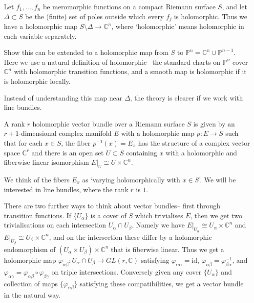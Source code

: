 Let \(f_1,\ldots,f_n\) be meromorphic functions on a compact Riemann surface \(S\),
and let \(\Delta\subset S\) be the (finite) set of poles outside which every
\(f_j\) is holomorphic. Thus we have a holomorphic map \(S\setminus \Delta
\to \mathbb{C}^n\), where `holomorphic' means holomorphic in each variable
separately.

\begin{exercise}
    Show this can be extended to a holomorphic map from \(S\) to
    \(\mathbb{P}^n=\mathbb{C}^n\cup \mathbb{P}^{n-1}\). Here we use a natural
    definition of holomorphic-- the standard charts on \(\mathbb{P}^n\) cover
    \(\mathbb{C}^n\) with holomorphic transition functions, and a smooth map is
    holomorphic if it is holomorphic locally.
\end{exercise}

Instead of understanding this map near \(\Delta\), the theory is clearer if we work with line bundles.

\begin{definition}
    A rank \(r\) holomorphic vector bundle over a Riemann surface \(S\) is
    given by an \(r+1\)-dimensional complex manifold \(E\) with a holomorphic
    map \(p:E\to S\) such that for each \(x\in S\), the fiber \(p^{-1}(x)=E_x\)
    has the structure of a complex vector space \(\mathbb{C}^r\) and there is
    an open set \(U\subset S\) containing \(x\) with a holomorphic and fiberwise
    linear isomorphism \(E|_U\cong U\times \mathbb{C}^n\).
\end{definition}

We think of the fibers \(E_x\) as `varying holomorphically with \(x\in S\)'. We
will be interested in line bundles, where the rank \(r\) is \(1\).

There are two further ways to think about vector bundles-- first through
transition functions. If \(\{U_\alpha\}\) is a cover of \(S\) which trivialises
\(E\), then we get two trivialisations on each intersection \(U_\alpha\cap
U_\beta\). Namely we have \(E|_{U_\alpha}\cong U_\alpha\times \mathbb{C}^n\)
and \(E|_{U_\beta}\cong U_\beta \times \mathbb{C}^n\), and on the
intersection these differ by a holomorphic endomorphism of \((U_\alpha \times
U_\beta)\times \mathbb{C}^n\) that is fiberwise linear. Thus we get a
holomorphic map \(\varphi_{\alpha\beta}:U_\alpha\cap U_\beta \to
GL(r,\mathbb{C})\) satisfying \(\varphi_{\alpha\alpha}=\text{id}\),
\(\varphi_{\alpha\beta}=\varphi_{\beta\alpha}^{-1}\), and
\(\varphi_{\alpha\gamma}=\varphi_{\alpha\beta}\circ \varphi_{\beta\gamma}\) on
triple intersections. Conversely given any cover \(\{U_\alpha\}\) and collection
of maps \(\{\varphi_{\alpha\beta}\}\) satisfying these compatibilities, we get a
vector bundle in the natural way.


